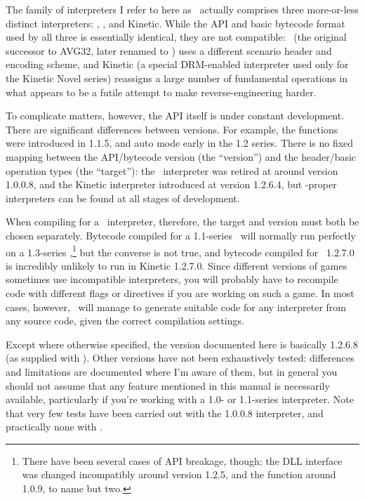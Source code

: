   \label{sec:targver}
  
    The family of interpreters I refer to here as \reallive\ actually comprises 
    three more-or-less distinct interpreters: \avgns, \reallive, and Kinetic. 
    While the API and basic bytecode format used by all three is essentially 
    identical, they are not compatible: \avgns\ (the original successor to 
    AVG32, later renamed to \reallive) uses a different scenario header and 
    encoding scheme, and Kinetic (a special DRM-enabled interpreter used only 
    for the Kinetic Novel series) reassigns a large number of fundamental 
    operations in what appears to be a futile attempt to make 
    reverse-engineering harder.
    
    To complicate matters, however, the API itself is under constant 
    development.  There are significant differences between versions.  For 
    example, the  functions were introduced in 1.1.5, and auto 
    mode early in the 1.2 series.  There is no fixed mapping between the 
    API/bytecode version (the ``version'') and the header/basic operation types 
    (the ``target''): the \avgns\ interpreter was retired at around version 
    1.0.0.8, and the Kinetic interpreter introduced at version 1.2.6.4, but 
    \reallive-proper interpreters can be found at all stages of development.
    
    When compiling for a \reallive\ interpreter, therefore, the target and 
    version must both be chosen separately.  Bytecode compiled for a 
    1.1-series \reallive\ will normally run perfectly on a 1.3-series 
    \reallive,\footnote{There have been several cases of API breakage, though; 
    the DLL interface was changed incompatibly around version 1.2.5, and the 
     function around 1.0.9, to name but two.} but the converse 
    is not true, and bytecode compiled for \reallive\ 1.2.7.0 is incredibly
    unlikely to run in Kinetic 1.2.7.0.  Since different versions of games 
    sometimes use incompatible interpreters, you will probably have to 
    recompile code with different flags or directives if you are working on 
    such a game.  In most cases, however, \compiler\ will manage to 
    generate suitable code for any interpreter from any source code, given 
    the correct compilation settings.
  
    Except where otherwise specified, the version documented here is basically 
    1.2.6.8 (as supplied with ).  Other versions 
    have not been exhaustively tested: differences and limitations are 
    documented where I'm aware of them, but in general you should not assume 
    that any feature mentioned in this manual is necessarily available, 
    particularly if you're working with a 1.0- or 1.1-series interpreter. Note 
    that very few tests have been carried out with the 1.0.0.8 interpreter, and 
    practically none with \avgns.
      
